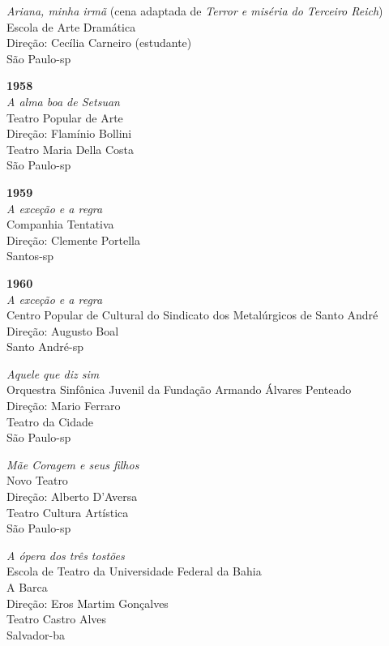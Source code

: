 {{\it Ariana, minha irmã} (cena adaptada de {\it Terror e miséria do
Terceiro Reich})\\
Escola de Arte Dramática\\
Direção: Cecília Carneiro (estudante)\\
São Paulo-{\sc sp}

\item{\bf 1958}\\
{\it A alma boa de Setsuan}\\
Teatro Popular de Arte\\
Direção: Flamínio Bollini\\
Teatro Maria Della Costa\\
São Paulo-{\sc sp}

\item{\bf 1959}\\
{\it A exceção e a regra}\\
Companhia Tentativa\\
Direção: Clemente Portella\\
Santos-{\sc sp}

\item{\bf 1960}\\
{\it A exceção e a regra}\\
Centro Popular de Cultural do Sindicato dos Metalúrgicos de Santo André\\
Direção: Augusto Boal\\
Santo André-{\sc sp}

{\it Aquele que diz sim}\\
Orquestra Sinfônica Juvenil da Fundação Armando Álvares Penteado\\
Direção: Mario Ferraro\\
Teatro da Cidade\\
São Paulo-{\sc sp}

{\it Mãe Coragem e seus filhos}\\
Novo Teatro\\
Direção: Alberto D'Aversa\\
Teatro Cultura Artística\\
São Paulo-{\sc sp}

{\it A ópera dos três tostões}\\
Escola de Teatro da Universidade Federal da Bahia\\
A Barca\\
Direção: Eros Martim Gonçalves\\
Teatro Castro Alves\\
Salvador-{\sc ba}

}
